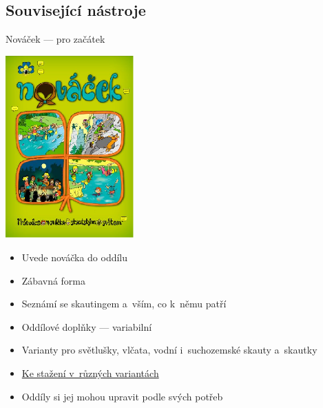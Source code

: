\documentclass[compress, ucs, xelatex, xcolor=dvipsnames, print,
  hyperref={
    bookmarks=true,
    unicode=true,
    colorlinks=true,
    plainpages=false,
    pdfkeywords={Junak, Pedagogika, Skaut, Skauting, Vychovna metoda},
    linkcolor=Black,
    anchorcolor=Black,
    citecolor=OliveGreen,
    filecolor=OliveGreen,
    menucolor=Black,
    urlcolor=OliveGreen,
    pdftex}
  ]{beamer}
\begin{document}
\subsection{Související nástroje}

\begin{frame}{Nováček --- pro začátek}
  \begin{multicols}{2}
    \includegraphics[height=7cm]{novacek.png}
    \columnbreak
    \begin{itemize}
      \item Uvede nováčka do oddílu
      \item Zábavná forma
      \item Seznámí se skautingem a~vším, co k~němu patří
      \item Oddílové doplňky --- variabilní
      \item Varianty pro světlušky, vlčata, vodní i~suchozemské skauty a~skautky
      \item \href{https://krizovatka.skaut.cz/oddil/program/skautky-a-skauti/skauti-skautky-stezky/novacek}{Ke stažení v~různých variantách}
      \item Oddíly si jej mohou upravit podle svých potřeb
    \end{itemize}
  \end{multicols}
\end{frame}
\end{document}
